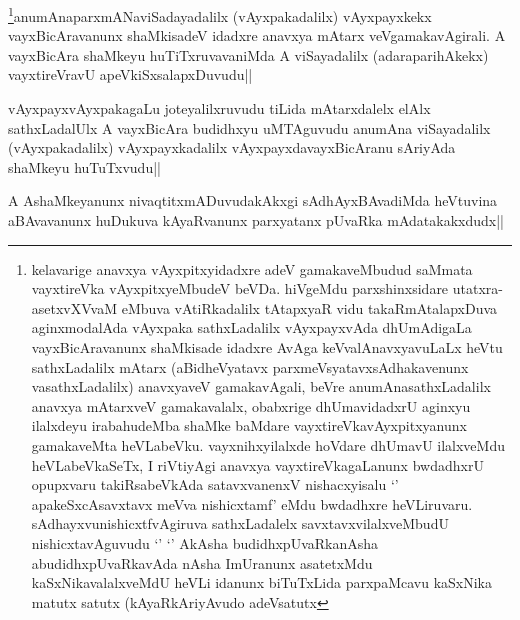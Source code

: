 \begin{artha}
\footnote{kelavarige anavxya vAyxpitxyidadxre adeV gamakaveMbudud  saMmata vayxtireVka vAyxpitxyeMbudeV beVDa. hiVgeMdu parxshinxsidare utatxra-asetxvXVvaM eMbuva vAtiRkadalilx tAtapxyaR vidu takaRmAtalapxDuva aginxmodalAda vAyxpaka sathxLadalilx vAyxpayxvAda dhUmAdigaLa vayxBicAravanunx shaMkisade idadxre AvAga keVvalAnavxyavuLaLx heVtu sathxLadalilx mAtarx (aBidheVyatavx parxmeVsyatavxsAdhakavenunx vasathxLadalilx) anavxyaveV gamakavAgali, beVre anumAnasathxLadalilx anavxya mAtarxveV gamakavalalx, obabxrige dhUmavidadxrU aginxyu ilalxdeyu irabahudeMba shaMke baMdare vayxtireVkavAyxpitxyanunx gamakaveMta heVLabeVku. vayxnihxyilalxde hoVdare dhUmavU ilalxveMdu heVLabeVkaSeTx, I riVtiyAgi anavxya vayxtireVkagaLanunx bwdadhxrU opupxvaru takiRsabeVkAda satavxvanenxV nishacxyisalu `\stext' apakeSxcAsavxtavx meVva nishicxtamf' eMdu bwdadhxre heVLiruvaru. sAdhayxvunishicxtfvAgiruva sathxLadalelx savxtavxvilalxveMbudU nishicxtavAguvudu `\stext' `\stext' AkAsha budidhxpUvaRkanAsha abudidhxpUvaRkavAda nAsha ImUranunx asatetxMdu kaSxNikavalalxveMdU heVLi idanunx biTuTxLida parxpaMcavu kaSxNika matutx satutx (kAyaRkAriyAvudo adeVsatutx}anumAnaparxmANaviSadayadalilx (vAyxpakadalilx) vAyxpayxkekx vayxBicAravanunx shaMkisadeV idadxre anavxya mAtarx veVgamakavAgirali. A vayxBicAra shaMkeyu huTiTxruvavaniMda A viSayadalilx (adaraparihAkekx) vayxtireVravU apeVkiSxsalapxDuvudu||
\end{artha}

\begin{artha}
vAyxpayxvAyxpakagaLu joteyalilxruvudu tiLida mAtarxdalelx elAlx sathxLadalUlx A vayxBicAra budidhxyu uMTAguvudu anumAna viSayadalilx (vAyxpakadalilx) vAyxpayxkadalilx vAyxpayxdavayxBicAranu sAriyAda shaMkeyu huTuTxvudu||
\end{artha}

\begin{artha}
A AshaMkeyanunx nivaqtitxmADuvudakAkxgi sAdhAyxBAvadiMda heVtuvina aBAvavanunx huDukuva kAyaRvanunx parxyatanx pUvaRka mAdatakakxdudx||
\end{artha}

